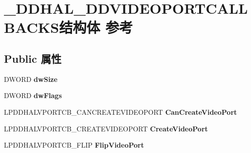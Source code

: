 \hypertarget{struct___d_d_h_a_l___d_d_v_i_d_e_o_p_o_r_t_c_a_l_l_b_a_c_k_s}{}\section{\+\_\+\+D\+D\+H\+A\+L\+\_\+\+D\+D\+V\+I\+D\+E\+O\+P\+O\+R\+T\+C\+A\+L\+L\+B\+A\+C\+K\+S结构体 参考}
\label{struct___d_d_h_a_l___d_d_v_i_d_e_o_p_o_r_t_c_a_l_l_b_a_c_k_s}
\subsection*{Public 属性}
\begin{DoxyCompactItemize}
\item 
\mbox{\label{struct___d_d_h_a_l___d_d_v_i_d_e_o_p_o_r_t_c_a_l_l_b_a_c_k_s_a78af80aafcbf79a41c7ca4e7e2ea1813}} 
D\+W\+O\+RD {\bfseries dw\+Size}
\item 
\mbox{\label{struct___d_d_h_a_l___d_d_v_i_d_e_o_p_o_r_t_c_a_l_l_b_a_c_k_s_abe4bb16096dd5016dd8032a819d8496a}} 
D\+W\+O\+RD {\bfseries dw\+Flags}
\item 
\mbox{\label{struct___d_d_h_a_l___d_d_v_i_d_e_o_p_o_r_t_c_a_l_l_b_a_c_k_s_ad2307ed5c651233d4d95f152b14cec7a}} 
L\+P\+D\+D\+H\+A\+L\+V\+P\+O\+R\+T\+C\+B\+\_\+\+C\+A\+N\+C\+R\+E\+A\+T\+E\+V\+I\+D\+E\+O\+P\+O\+RT {\bfseries Can\+Create\+Video\+Port}
\item 
\mbox{\label{struct___d_d_h_a_l___d_d_v_i_d_e_o_p_o_r_t_c_a_l_l_b_a_c_k_s_a5aa2abb85af0cb2ac2552aeedb1cf802}} 
L\+P\+D\+D\+H\+A\+L\+V\+P\+O\+R\+T\+C\+B\+\_\+\+C\+R\+E\+A\+T\+E\+V\+I\+D\+E\+O\+P\+O\+RT {\bfseries Create\+Video\+Port}
\item 
\mbox{\label{struct___d_d_h_a_l___d_d_v_i_d_e_o_p_o_r_t_c_a_l_l_b_a_c_k_s_abd82c20135d22c8d25d619fe241d9cf2}} 
L\+P\+D\+D\+H\+A\+L\+V\+P\+O\+R\+T\+C\+B\+\_\+\+F\+L\+IP {\bfseries Flip\+Video\+Port}
\item 

\end{DoxyCompactItemize}
